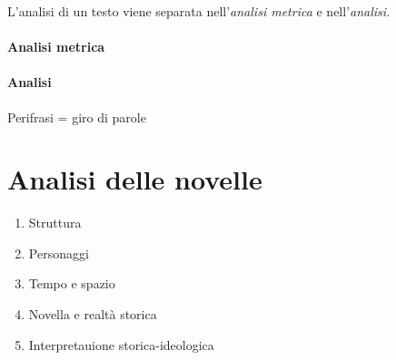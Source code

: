 \documentclass[a4paper]{article}
\begin{document}
L'analisi di un testo viene separata nell'\textit{analisi metrica} e nell'\textit{analisi}.

\paragraph{Analisi metrica}

\phantom{ }\vspace{0.1cm}

\paragraph{Analisi}

Perifrasi = giro di parole

\section{Analisi delle novelle}

\begin{enumerate}
    \item Struttura
    \item Personaggi
    \item Tempo e spazio
    \item Novella e realtà storica
    \item Interpretauione storica-ideologica
\end{enumerate}
\end{document}
